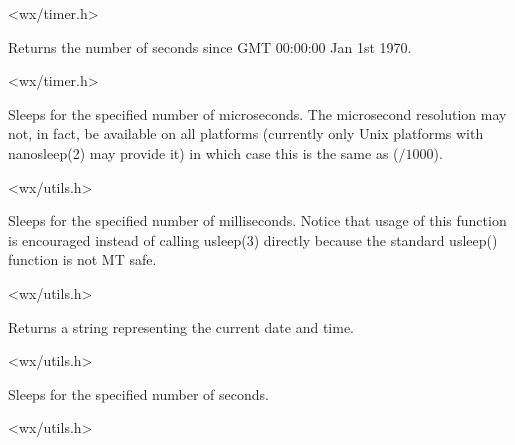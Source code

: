 <wx/timer.h>


\label{wxgetutctime}


Returns the number of seconds since GMT 00:00:00 Jan 1st 1970.




<wx/timer.h>


\label{wxmicrosleep}


Sleeps for the specified number of microseconds. The microsecond resolution may
not, in fact, be available on all platforms (currently only Unix platforms with
nanosleep(2) may provide it) in which case this is the same as 
($/1000$).


<wx/utils.h>


\label{wxmillisleep}


Sleeps for the specified number of milliseconds. Notice that usage of this
function is encouraged instead of calling usleep(3) directly because the
standard usleep() function is not MT safe.


<wx/utils.h>


\label{wxnow}


Returns a string representing the current date and time.


<wx/utils.h>


\label{wxsleep}


Sleeps for the specified number of seconds.


<wx/utils.h>


\label{wxstarttimer}

